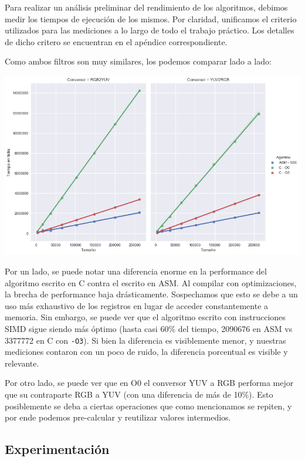 Para realizar un análisis preliminar del rendimiento de los algoritmos, debimos medir los tiempos de ejecución de los mismos. Por claridad, unificamos el criterio utilizados para las mediciones a lo largo de todo el trabajo práctico. Los detalles de dicho critero se encuentran en el apéndice correspondiente.

Como ambos filtros son muy similares, los podemos comparar lado a lado:

\begin{center}
	\includegraphics[scale=0.5]{img/conversores_CvsASMvsO3.png}
\end{center}

Por un lado, se puede notar una diferencia enorme en la performance del algoritmo escrito en C contra el escrito en ASM. Al compilar con optimizaciones, la brecha de performance baja drásticamente. Sospechamos que esto se debe a un uso más exhaustivo de los registros en lugar de acceder constantemente a memoria. Sin embargo, se puede ver que el algoritmo escrito con instrucciones SIMD sigue siendo más óptimo (hasta casi 60\% del tiempo, 2090676 en ASM vs 3377772 en C con \texttt{-O3}). Si bien la diferencia es visiblemente menor, y nuestras mediciones contaron con un poco de ruido, la diferencia porcentual es visible y relevante.

Por otro lado, se puede ver que en O0 el conversor YUV a RGB performa mejor que su contraparte RGB a YUV (con una diferencia de más de 10\%). Esto posiblemente se deba a ciertas operaciones que como mencionamos se repiten, y por ende podemos pre-calcular y reutilizar valores intermedios.

\subsection{Experimentación}

